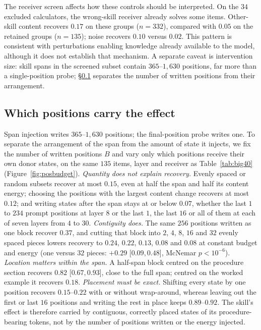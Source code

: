 \documentclass{article}
\begin{document}
The receiver screen affects how these controls should be interpreted. On the
$34$ excluded calculators, the wrong-skill receiver already solves some items.
Other-skill content recovers $0.17$ on these groups ($n=332$), compared with
$0.05$ on the retained groups ($n=135$); noise recovers $0.10$ versus $0.02$.
This pattern is consistent with perturbations enabling knowledge already
available to the model, although it does not establish that mechanism.
A separate caveat is intervention size: skill spans in the screened subset
contain $365$--$1{,}630$ positions, far more than a single-position probe;
\S\ref{sec:posbudget} separates the number of written positions from their
arrangement.

\subsection{Which positions carry the effect}
\label{sec:posbudget}

Span injection writes $365$--$1{,}630$ positions; the final-position probe
writes one. To separate the arrangement of the span from the amount of state
it injects, we fix the number of written positions $B$ and vary only which
positions receive their own donor states, on the same $135$ items, layer and
receiver as Table~\ref{tab:big40} (Figure~\ref{fig:posbudget}).
\emph{Quantity does not explain recovery.} Evenly spaced or random subsets
recover at most $0.15$, even at half the span and half its content energy;
choosing the positions with the largest content change recovers at most
$0.12$; and writing states after the span stays at or below $0.07$, whether
the last $1$ to $234$ prompt positions at layer $8$ or the last $1$, the last
$16$ or all of them at each of seven layers from $4$ to $30$.
\emph{Contiguity does.} The same $256$ positions written as one block recover
$0.37$, and cutting that block into $2$, $4$, $8$, $16$ and $32$ evenly spaced
pieces lowers recovery to $0.24$, $0.22$, $0.13$, $0.08$ and $0.08$ at constant
budget and energy (one versus $32$ pieces: $+0.29$ [$0.09,0.48$], McNemar
$p<10^{-6}$). \emph{Location matters within the span.} A half-span block
centred on the procedure section recovers $0.82$ [$0.67,0.93$], close to the
full span; centred on the worked example it recovers $0.18$. \emph{Placement
must be exact.} Shifting every state by one position recovers $0.15$--$0.22$
with or without wrap-around, whereas leaving out the first or last $16$
positions and writing the rest in place keeps $0.89$--$0.92$. The skill's
effect is therefore carried by contiguous, correctly placed states of its
procedure-bearing tokens, not by the number of positions written or the
energy injected.
\end{document}
